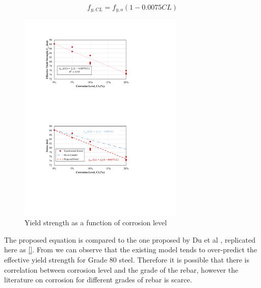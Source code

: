 \begin{equation}
    f_{y,CL} = f_{y,o}(1-0.0075CL)
    \label{eq.Calderon_Fy_vs_CL}
\end{equation}

\begin{figure}[htbp]
	\centering
	\includegraphics[width=0.7\textwidth]{VAC Thesis 2.0/Chapter-4/figs/TensionTest_results_2.pdf}
	\caption{Yield strength as a function of corrosion level}
	\label{fig:YieldStrength_vs_CL}
\end{figure}

The proposed equation is compared to the one proposed by Du et al \cite{Du2005}, replicated here as \ref{}. From  we can observe that the existing model tends to over-predict the effective yield strength for Grade 80 steel. Therefore it is possible that there is correlation between corrosion level and the grade of the rebar, however the literature on corrosion for different grades of rebar is scarce. 

